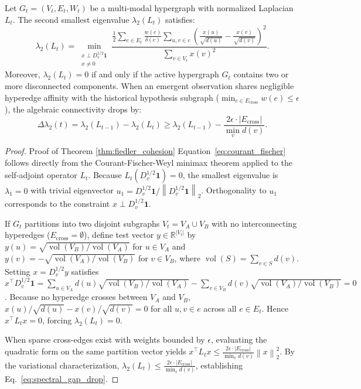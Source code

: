 \documentclass[ijds,dblanonrev]{informs4}
\DeclareMathOperator{\vol}{vol}
\newcommand{\R}{\mathbb{R}}
\newcommand{\norm}[1]{\left\lVert#1\right\rVert}
\begin{document}
\begin{theorem}
\label{thm:fiedler_cohesion}
Let $G_t = (V_t, E_t, W_t)$ be a multi-modal hypergraph with normalized Laplacian $L_t$. The second smallest eigenvalue $\lambda_2(L_t)$ satisfies:
\begin{equation}
  \lambda_2(L_t) = \min_{\substack{x \perp D_v^{1/2} \mathbf{1} \\ x \ne 0}} \frac{\frac{1}{2} \sum_{e \in E_t} \frac{w(e)}{\delta(e)} \sum_{u, v \in e} \left( \frac{x(u)}{\sqrt{d(u)}} - \frac{x(v)}{\sqrt{d(v)}} \right)^2}{\sum_{v \in V_t} x(v)^2}.
  \label{eq:courant_fischer}
\end{equation}
Moreover, $\lambda_2(L_t) = 0$ if and only if the active hypergraph $G_t$ contains two or more disconnected components. When an emergent observation shares negligible hyperedge affinity with the historical hypothesis subgraph ($\min_{e \in E_{\text{cross}}} w(e) \le \epsilon$), the algebraic connectivity drops by:
\begin{equation}
  \Delta \lambda_2(t) = \lambda_2(L_{t-1}) - \lambda_2(L_t) \ge \lambda_2(L_{t-1}) - \frac{2\epsilon \cdot |E_{\text{cross}}|}{\min_{v} d(v)}.
  \label{eq:spectral_gap_drop}
\end{equation}
\end{theorem}

\begin{proof}{Proof of Theorem \ref{thm:fiedler_cohesion}}
Equation~\eqref{eq:courant_fischer} follows directly from the Courant-Fischer-Weyl minimax theorem applied to the self-adjoint operator $L_t$. Because $L_t (D_v^{1/2} \mathbf{1}) = 0$, the smallest eigenvalue is $\lambda_1 = 0$ with trivial eigenvector $u_1 = D_v^{1/2} \mathbf{1} / \norm{D_v^{1/2} \mathbf{1}}_2$. Orthogonality to $u_1$ corresponds to the constraint $x \perp D_v^{1/2} \mathbf{1}$.

If $G_t$ partitions into two disjoint subgraphs $V_t = V_A \cup V_B$ with no interconnecting hyperedges ($E_{\text{cross}} = \emptyset$), define test vector $y \in \R^{|V_t|}$ by $y(u) = \sqrt{\vol(V_B)/\vol(V_A)}$ for $u \in V_A$ and $y(v) = -\sqrt{\vol(V_A)/\vol(V_B)}$ for $v \in V_B$, where $\vol(S) = \sum_{v \in S} d(v)$. Setting $x = D_v^{1/2} y$ satisfies $x^\top D_v^{1/2} \mathbf{1} = \sum_{u \in V_A} d(u) \sqrt{\vol(V_B)/\vol(V_A)} - \sum_{v \in V_B} d(v) \sqrt{\vol(V_A)/\vol(V_B)} = 0$. Because no hyperedge crosses between $V_A$ and $V_B$, $x(u)/\sqrt{d(u)} - x(v)/\sqrt{d(v)} = 0$ for all $u, v \in e$ across all $e \in E_t$. Hence $x^\top L_t x = 0$, forcing $\lambda_2(L_t) = 0$.

When sparse cross-edges exist with weights bounded by $\epsilon$, evaluating the quadratic form on the same partition vector yields $x^\top L_t x \le \frac{2\epsilon \cdot |E_{\text{cross}}|}{\min_v d(v)} \norm{x}_2^2$. By the variational characterization, $\lambda_2(L_t) \le \frac{2\epsilon \cdot |E_{\text{cross}}|}{\min_v d(v)}$, establishing Eq.~\eqref{eq:spectral_gap_drop}.\Halmos
\end{proof}
\end{document}
